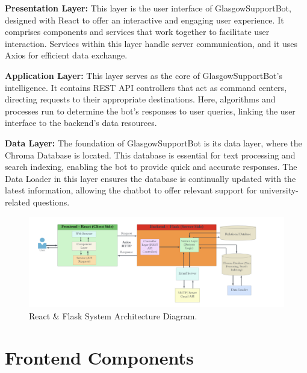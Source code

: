 \documentclass{l4proj}
\begin{document}
\textbf{Presentation Layer:} This layer is the user interface of GlasgowSupportBot, designed with React to offer an interactive and engaging user experience. It comprises components and services that work together to facilitate user interaction. Services within this layer handle server communication, and it uses Axios for efficient data exchange.

\textbf{Application Layer:} This layer serves as the core of GlasgowSupportBot's intelligence. It contains REST API controllers that act as command centers, directing requests to their appropriate destinations. Here, algorithms and processes run to determine the bot's responses to user queries, linking the user interface to the backend's data resources.

\textbf{Data Layer:} The foundation of GlasgowSupportBot is its data layer, where the Chroma Database is located. This database is essential for text processing and search indexing, enabling the bot to provide quick and accurate responses. The Data Loader in this layer ensures the database is continually updated with the latest information, allowing the chatbot to offer relevant support for university-related questions.

\begin{figure}[!htb]
  \centering
  \begin{adjustbox}{center,max height=0.30\textheight, max width=\linewidth}
    \includegraphics{images/systemarchitecture.png}
  \end{adjustbox}
  \caption{React \& Flask System Architecture Diagram.}
\end{figure}

\section*{Frontend Components}
\end{document}
